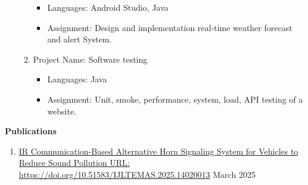 \documentclass[a4paper,10pt]{article}
\begin{document}
\begin{itemize}
\begin{enumerate}[label=\Roman*.]
              \begin{itemize}[]
                  \item {Languages:} Android Studio, Java \\[0.5em]
                  \item {Assignment:} Design and implementation real-time weather forecast and alert System. \\[1em]
              \end{itemize}
        \item {Project Name:} Software testing \\[0.5em]
              \begin{itemize}[]
                  \item {Languages:} Java \\[0.5em]
                  \item {Assignment:} Unit, smoke, performance, system, load, API testing of a website.
              \end{itemize}
    \end{enumerate}
\end{itemize}

\begin{tcolorbox}[colback=white, colframe=black, arc=3mm, boxrule=0.5mm, width=\textwidth]
    {\Large \textbf{Publications}}
\end{tcolorbox}

\begin{enumerate}
    \item \href{https://doi.org/10.51583/IJLTEMAS.2025.14020013}{IR Communication-Based Alternative Horn Signaling System for Vehicles to Reduce Sound Pollution URL: https://doi.org/10.51583/IJLTEMAS.2025.14020013} \hfill {March 2025}
\end{enumerate}
\end{document}
